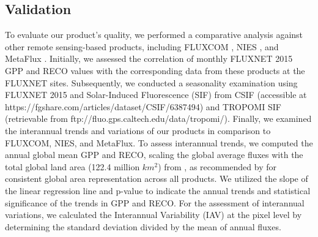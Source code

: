 \subsection{Validation}
To evaluate our product's quality, we performed a comparative analysis against other remote sensing-based products, including FLUXCOM \citep{jung2019fluxcom}, NIES \citep{zeng2020global}, and MetaFlux \citep{nathaniel2023metaflux}. Initially, we assessed the correlation of monthly FLUXNET 2015 GPP and RECO values with the corresponding data from these products at the FLUXNET sites. Subsequently, we conducted a seasonality examination using FLUXNET 2015 and Solar-Induced Fluorescence (SIF) from CSIF \citep{zhang2018global} (accessible at https://fgshare.com/articles/dataset/CSIF/6387494) and TROPOMI SIF \citep{kohler2018global} (retrievable from ftp://fluo.gps.caltech.edu/data/tropomi/). Finally, we examined the interannual trends and variations of our products in comparison to FLUXCOM, NIES, and MetaFlux. To assess interannual trends, we computed the annual global mean GPP and RECO, scaling the global average fluxes with the total global land area (122.4 million $km^{2}$) from \citep{friedl2010modis}, as recommended by \citep{jung2020scaling} for consistent global area representation across all products. We utilized the slope of the linear regression line and p-value to indicate the annual trends and statistical significance of the trends in GPP and RECO. For the assessment of interannual variations, we calculated the Interannual Variability (IAV) at the pixel level by determining the standard deviation divided by the mean of annual fluxes. \par

